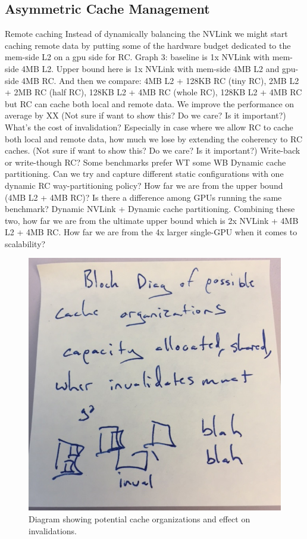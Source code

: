 \subsection{Asymmetric Cache Management}
\label{caching}
Remote caching
Instead of dynamically balancing the NVLink we might start caching remote data by putting some of the hardware budget dedicated to the mem-side L2 on a gpu side for RC. 
Graph 3: baseline is 1x NVLink with mem-side 4MB L2. Upper bound here is 1x NVLink with mem-side 4MB L2 and gpu-side 4MB RC. And then we compare: 4MB L2 + 128KB RC (tiny RC), 2MB L2 + 2MB RC (half RC), 128KB L2 + 4MB RC (whole RC), 128KB L2 + 4MB RC but RC can cache both local and remote data. We improve the performance on average by XX%
(Not sure if want to show this? Do we care? Is it important?) What’s the cost of invalidation? Especially in case where we allow RC to cache both local and remote data, how much we lose by extending the coherency to RC caches. 
(Not sure if want to show this? Do we care? Is it important?) Write-back or write-though RC? Some benchmarks prefer WT some WB
Dynamic cache partitioning. Can we try and capture different static configurations with one dynamic RC way-partitioning policy? How far we are from the upper bound (4MB L2 + 4MB RC)? Is there a difference among GPUs running the same benchmark? 
Dynamic NVLink + Dynamic cache partitioning. Combining these two, how far we are from the ultimate upper bound which is 2x NVLink + 4MB L2 + 4MB RC. How far we are from the 4x larger single-GPU when it comes to scalability?

\begin{figure}[tp]
    \centering
    \includegraphics[width=0.9\columnwidth]{figures/cacheorg.jpg}
    \caption{Diagram showing potential cache organizations and effect on invalidations.}
    \label{fig:cacheorg}
\end{figure}



